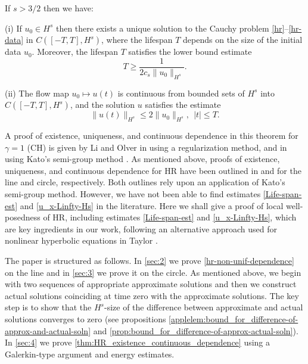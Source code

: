 %
%
%
%
%
%
\begin{theorem}
\label{thm:HR_existence_continuous_dependence}
If   $s>3/2$  then we have:

(i) If $u_0\in H^s$  then  there exists a unique solution to
the Cauchy problem  \eqref{hr}--\eqref{hr-data} in $C([-T, T], H^s)$, where 
the lifespan  $T$ depends on the size
of the initial data $u_0$. Moreover, 
the  lifespan $T$ satisfies the lower bound estimate 
%
%
%
\begin{equation}
\label{Life-span-est}
T
\ge
\frac{1}{2c_s \|u_0\|_{H^s}}.
\end{equation}
%

(ii)
The flow map $u_0 \mapsto u(t)$ is continuous from
bounded sets of $H^s$ into \\ $C([-T, T], H^s)$,
and the solution $u$ satisfies the estimate
%
%
%
\begin{equation}
\label{u_x-Linfty-Hs}
\|
u(t)
\|_ {H^s}
\le
2
\|
u_0
\|_{H^s}, \ \ |t|\le T.
\end{equation}
%
%
%
\end{theorem}
%
%
A proof of existence, uniqueness, and continuous dependence in this 
theorem for $\gamma =1$ (CH) 
is given  by Li and Olver in 
\cite{Li_2000_Well-posedness-} using a regularization method, and in
\cite{Rodriguez-Blanco_2001_On-the-Cauchy-p} using 
Kato's semi-group method \cite{Kato_1975_Quasi-linear-eq}. As mentioned 
above, proofs of 
existence, uniqueness, and continuous dependence for  HR
have been outlined in \cite{Yin_2003_On-the-Cauchy-p} and 
\cite{Zhou_2005_Local-well-pose} for the line and circle, 
respectively. Both outlines rely upon an application of Kato's semi-group 
method. However, we have not been able to find estimates  
\eqref{Life-span-est} and \eqref{u_x-Linfty-Hs}  in the literature.
Here we shall give a proof of local well-posedness of HR,
including  estimates \eqref{Life-span-est} and \eqref{u_x-Linfty-Hs},
which are key ingredients in our work, 
following an alternative approach used for nonlinear hyperbolic equations
in Taylor \cite{Taylor_1991_Pseudodifferent}.

The  paper is structured as follows. In \cref{sec:2} we prove 
\cref{hr-non-unif-dependence} on the line and 
in  \cref{sec:3}  we prove it on the circle.
As mentioned above, we begin with two sequences of
appropriate approximate solutions and then 
we construct  actual solutions
coinciding at time zero  with the approximate solutions.
The key step is to show that  the $H^s$-size of
the difference between approximate and actual solutions 
converges to zero (see propositions \ref{applelem:bound_for_difference-of-approx-and-actual-soln}
and  \ref{prop:bound_for_difference-of-approx-actual-soln}). 
In \cref{sec:4} we  prove 
\cref{thm:HR_existence_continuous_dependence} 
using a Galerkin-type argument and energy estimates.
%
%
%
%	
%
%
%
%
%
%
%
%
%
%
%
